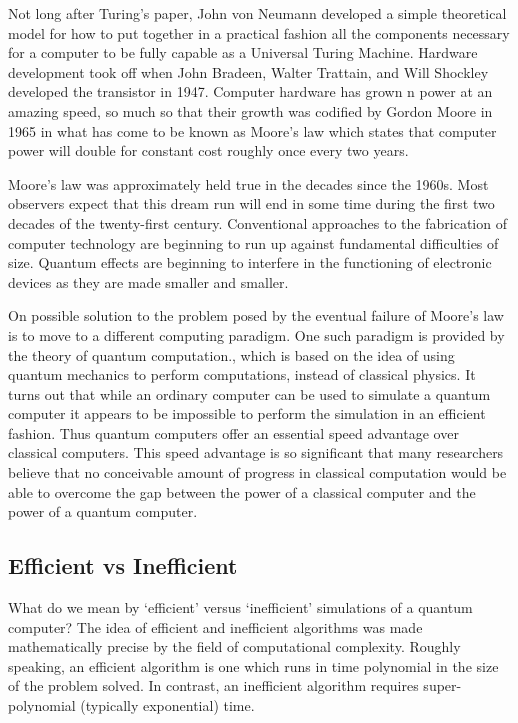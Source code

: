 \documentclass[12pt, oneside]{book}
\theoremstyle{definition}
\theoremstyle{definition}
\theoremstyle{remark}
\begin{document}
Not long after Turing's paper, John von Neumann developed a simple theoretical model for how to put together in a practical fashion all the components necessary for a computer to be fully capable as a Universal Turing Machine. Hardware development took off when John Bradeen, Walter Trattain, and Will Shockley developed the transistor in 1947. Computer hardware has grown n power at an amazing speed, so much so that their growth was codified by Gordon Moore in 1965 in what has come to be known as Moore's law which states that computer power will double for constant cost roughly once every two years.

Moore's law was approximately held true in the decades since the 1960s. Most observers expect that this dream run will end in some time during the first two decades of the twenty-first century. Conventional approaches to the fabrication of computer technology are beginning to run up against fundamental difficulties of size. Quantum effects are beginning to interfere in the functioning of electronic devices as they are made smaller and smaller.

On possible solution to the problem posed by the eventual failure of Moore's law is to move to a different computing paradigm. One such paradigm is provided by the theory of quantum computation., which is based on the idea of using quantum mechanics to perform computations, instead of classical physics. It turns out that while an ordinary computer can be used to simulate a quantum computer it appears to be impossible to perform the simulation in an efficient fashion. Thus quantum computers offer an essential speed advantage over classical computers. This speed advantage is so significant that many researchers believe that no conceivable amount of progress in classical computation would be able to overcome the gap between the power of a classical computer and the power of a quantum computer. 

\subsection{Efficient vs Inefficient}
What do we mean by `efficient' versus `inefficient' simulations of a quantum computer? The idea of efficient and inefficient algorithms was made mathematically precise by the field of computational complexity. Roughly speaking, an efficient algorithm is one which runs in time polynomial in the size of the problem solved. In contrast, an inefficient algorithm requires super-polynomial (typically exponential) time. 
\end{document}
